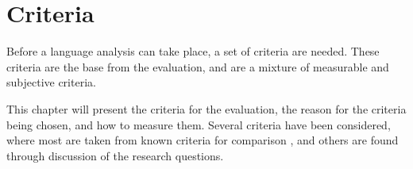 \chapter{Criteria}
\label{chap:criteria}


Before a language analysis can take place, a set of criteria are needed. These criteria are the base from the evaluation, and are a mixture of measurable and subjective criteria.

This chapter will present the criteria for the evaluation, the reason for the criteria being chosen, and how to measure them. Several criteria have been considered, where most are taken from known criteria for comparison \cite{design_criteria1} \cite{design_criteria2}, and others are found through discussion of the research questions.


